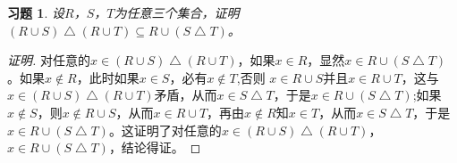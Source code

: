 \documentclass{article}
\begin{document}
\begin{CJK}{UTF8}{gbsn}
  \newtheorem*{Ex}{习题}
  \begin{Ex}   
      设$R$，$S$，$T$为任意三个集合，证明$ (R\cup S)\bigtriangleup (R\cup T)\subseteq R\cup (S\bigtriangleup T)$。
\end{Ex}
\begin{proof}[证明]对任意的$x\in (R\cup S)\bigtriangleup (R\cup T)$，如果$x\in R$，显然$x\in R\cup (S\bigtriangleup T)$。如果$x\notin R$，此时如果$x\in S$，必有$x\notin T$,否则
  $x \in R\cup S$并且$x\in R\cup T$，这与$x\in (R\cup S)\bigtriangleup (R\cup T)$矛盾，从而$x\in S\bigtriangleup T$，于是$x\in R\cup (S\bigtriangleup T)$;如果$x\notin S$，则$x\notin R\cup S$，从而$x\in R\cup T$，再由$x\notin R$知$x\in T$，从而$x\in S\bigtriangleup T$，于是$x\in R\cup (S\bigtriangleup T)$。这证明了对任意的$x\in (R\cup S)\bigtriangleup (R\cup T)$，$x\in R\cup (S\bigtriangleup T)$，结论得证。
\end{proof}
\end{CJK}
\end{document}
